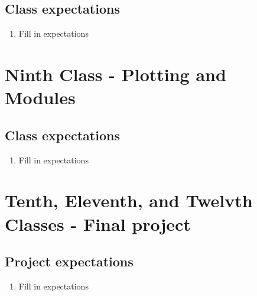 \documentclass[paper=a4, fontsize=11pt]{scrartcl} %
\numberwithin{equation}{section} %
\numberwithin{figure}{section} %
\numberwithin{table}{section} %
\begin{document}

\subsection{Class expectations}

\begin{enumerate}
\item Fill in expectations
\end{enumerate}


\section{Ninth Class - Plotting and Modules}


\subsection{Class expectations}

\begin{enumerate}
\item Fill in expectations
\end{enumerate}


\section{Tenth, Eleventh, and Twelvth Classes - Final project}


\subsection{Project expectations}

\begin{enumerate}
\item Fill in expectations
\end{enumerate}

\end{document}
